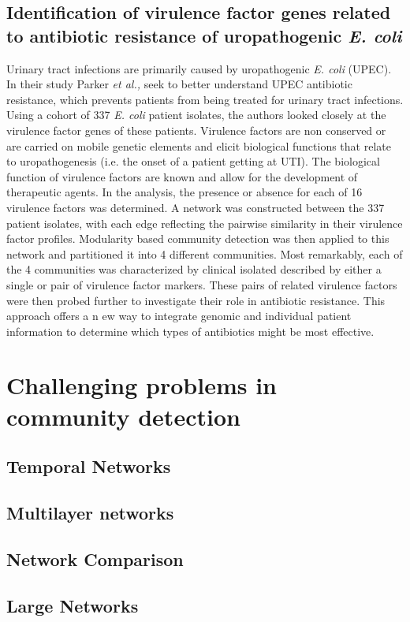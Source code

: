 \subsection{Identification of virulence factor genes related to antibiotic resistance of uropathogenic \emph{E. coli}}
\indent Urinary tract infections are primarily caused by uropathogenic \emph{E. coli} (UPEC). In their study Parker \emph{et al.,} seek to better understand UPEC antibiotic resistance, which prevents patients from being treated for urinary tract infections. Using a cohort of 337 \emph{E. coli} patient isolates, the authors looked closely at the virulence factor genes of these patients. Virulence factors are non conserved or are carried on mobile genetic elements and elicit biological functions that relate to uropathogenesis (i.e. the onset of a patient getting at UTI). The biological function of virulence factors are known and allow for the development of therapeutic agents. In the analysis, the presence or absence for each of 16 virulence factors was determined. A network was constructed between the 337 patient isolates, with each edge reflecting the pairwise similarity in their virulence factor profiles. Modularity based community detection was then applied to this network and partitioned it into 4 different communities. Most remarkably, each of the 4 communities was characterized by clinical isolated described by either a single or pair of virulence factor markers. These pairs of related virulence factors were then probed further to investigate their role in antibiotic resistance. This approach offers a n ew way to integrate genomic and individual patient information to determine which types of antibiotics might be most effective.  
\section{Challenging problems in community detection}
\subsection{Temporal Networks}
\subsection{Multilayer networks}
\subsection{Network Comparison}
\subsection{Large Networks}

